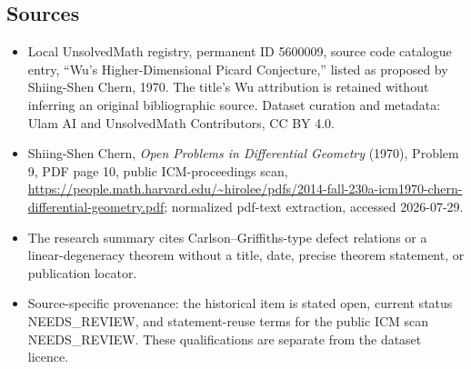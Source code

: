 \documentclass[11pt]{article}
\begin{document}
\subsection{Sources}
\begin{itemize}
\item Local UnsolvedMath registry, permanent ID 5600009, source code catalogue entry, ``Wu's Higher-Dimensional Picard Conjecture,'' listed as proposed by Shiing-Shen Chern, 1970. The title's Wu attribution is retained without inferring an original bibliographic source. Dataset curation and metadata: Ulam AI and UnsolvedMath Contributors, CC BY 4.0.
\item Shiing-Shen Chern, \emph{Open Problems in Differential Geometry} (1970), Problem 9, PDF page 10, public ICM-proceedings scan, \url{https://people.math.harvard.edu/~hirolee/pdfs/2014-fall-230a-icm1970-chern-differential-geometry.pdf}; normalized pdf-text extraction, accessed 2026-07-29.
\item The research summary cites Carlson--Griffiths-type defect relations or a linear-degeneracy theorem without a title, date, precise theorem statement, or publication locator.
\item Source-specific provenance: the historical item is stated open, current status NEEDS\_REVIEW, and statement-reuse terms for the public ICM scan NEEDS\_REVIEW. These qualifications are separate from the dataset licence.
\end{itemize}
\end{document}

